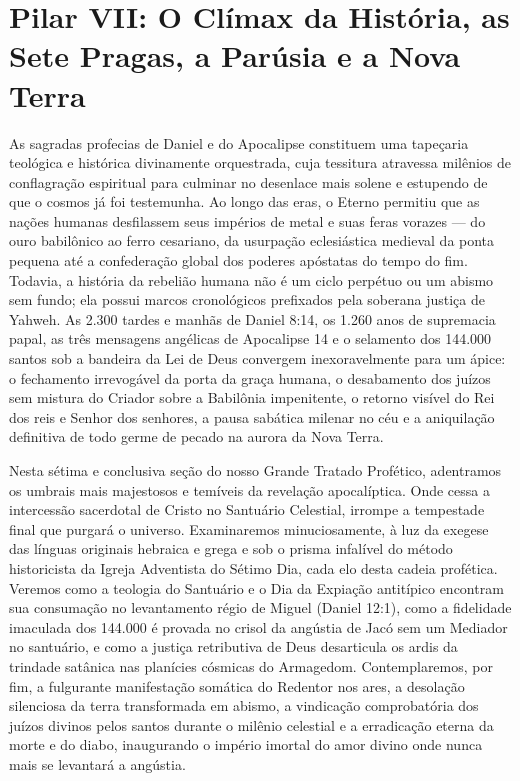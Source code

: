 \chapter{Pilar VII: O Clímax da História, as Sete Pragas, a Parúsia e a Nova Terra}






As sagradas profecias de Daniel e do Apocalipse constituem uma tapeçaria teológica e histórica divinamente orquestrada, cuja tessitura atravessa milênios de conflagração espiritual para culminar no desenlace mais solene e estupendo de que o cosmos já foi testemunha. Ao longo das eras, o Eterno permitiu que as nações humanas desfilassem seus impérios de metal e suas feras vorazes — do ouro babilônico ao ferro cesariano, da usurpação eclesiástica medieval da ponta pequena até a confederação global dos poderes apóstatas do tempo do fim. Todavia, a história da rebelião humana não é um ciclo perpétuo ou um abismo sem fundo; ela possui marcos cronológicos prefixados pela soberana justiça de Yahweh. As 2.300 tardes e manhãs de Daniel 8:14, os 1.260 anos de supremacia papal, as três mensagens angélicas de Apocalipse 14 e o selamento dos 144.000 santos sob a bandeira da Lei de Deus convergem inexoravelmente para um ápice: o fechamento irrevogável da porta da graça humana, o desabamento dos juízos sem mistura do Criador sobre a Babilônia impenitente, o retorno visível do Rei dos reis e Senhor dos senhores, a pausa sabática milenar no céu e a aniquilação definitiva de todo germe de pecado na aurora da Nova Terra.

Nesta sétima e conclusiva seção do nosso Grande Tratado Profético, adentramos os umbrais mais majestosos e temíveis da revelação apocalíptica. Onde cessa a intercessão sacerdotal de Cristo no Santuário Celestial, irrompe a tempestade final que purgará o universo. Examinaremos minuciosamente, à luz da exegese das línguas originais hebraica e grega e sob o prisma infalível do método historicista da Igreja Adventista do Sétimo Dia, cada elo desta cadeia profética. Veremos como a teologia do Santuário e o Dia da Expiação antitípico encontram sua consumação no levantamento régio de Miguel (Daniel 12:1), como a fidelidade imaculada dos 144.000 é provada no crisol da angústia de Jacó sem um Mediador no santuário, e como a justiça retributiva de Deus desarticula os ardis da trindade satânica nas planícies cósmicas do Armagedom. Contemplaremos, por fim, a fulgurante manifestação somática do Redentor nos ares, a desolação silenciosa da terra transformada em abismo, a vindicação comprobatória dos juízos divinos pelos santos durante o milênio celestial e a erradicação eterna da morte e do diabo, inaugurando o império imortal do amor divino onde nunca mais se levantará a angústia.



